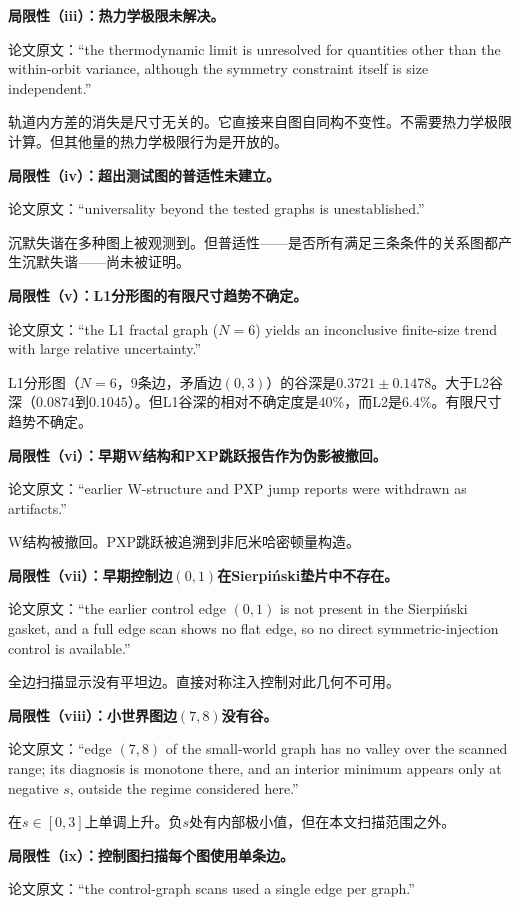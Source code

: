 \documentclass[11pt,a4paper]{book}
\theoremstyle{definition}
\begin{document}
\textbf{局限性（iii）：热力学极限未解决。}

论文原文：“the thermodynamic limit is unresolved for quantities other than the within-orbit variance, although the symmetry constraint itself is size independent.”

轨道内方差的消失是尺寸无关的。它直接来自图自同构不变性。不需要热力学极限计算。但其他量的热力学极限行为是开放的。

\textbf{局限性（iv）：超出测试图的普适性未建立。}

论文原文：“universality beyond the tested graphs is unestablished.”

沉默失谐在多种图上被观测到。但普适性——是否所有满足三条条件的关系图都产生沉默失谐——尚未被证明。

\textbf{局限性（v）：L1分形图的有限尺寸趋势不确定。}

论文原文：“the L1 fractal graph ($N=6$) yields an inconclusive finite-size trend with large relative uncertainty.”

L1分形图（$N=6$，9条边，矛盾边$(0,3)$）的谷深是$0.3721\pm0.1478$。大于L2谷深（$0.0874$到$0.1045$）。但L1谷深的相对不确定度是$40\%$，而L2是$6.4\%$。有限尺寸趋势不确定。

\textbf{局限性（vi）：早期W结构和PXP跳跃报告作为伪影被撤回。}

论文原文：“earlier W-structure and PXP jump reports were withdrawn as artifacts.”

W结构被撤回。PXP跳跃被追溯到非厄米哈密顿量构造。

\textbf{局限性（vii）：早期控制边$(0,1)$在Sierpiński垫片中不存在。}

论文原文：“the earlier control edge $(0,1)$ is not present in the Sierpiński gasket, and a full edge scan shows no flat edge, so no direct symmetric-injection control is available.”

全边扫描显示没有平坦边。直接对称注入控制对此几何不可用。

\textbf{局限性（viii）：小世界图边$(7,8)$没有谷。}

论文原文：“edge $(7,8)$ of the small-world graph has no valley over the scanned range; its diagnosis is monotone there, and an interior minimum appears only at negative $s$, outside the regime considered here.”

在$s\in[0,3]$上单调上升。负$s$处有内部极小值，但在本文扫描范围之外。

\textbf{局限性（ix）：控制图扫描每个图使用单条边。}

论文原文：“the control-graph scans used a single edge per graph.”
\end{document}

